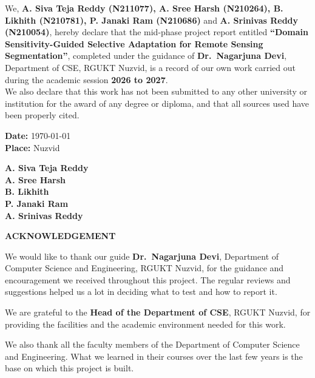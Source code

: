 \documentclass[11pt,a4paper]{report}
\newif\ifblankpage
\newcommand{\blankpage}{%
  \clearpage\blankpagetrue\thispagestyle{empty}\null\clearpage
  \blankpagefalse\addtocounter{page}{-1}}
\begin{document}
We, \textbf{A. Siva Teja Reddy (N211077), A. Sree Harsh (N210264), B. Likhith (N210781), P. Janaki Ram (N210686)} and \textbf{A. Srinivas Reddy (N210054)}, hereby declare that the mid-phase project report entitled \textbf{``Domain Sensitivity-Guided Selective Adaptation for Remote Sensing Segmentation''}, completed under the guidance of \textbf{Dr.~Nagarjuna Devi}, Department of CSE, RGUKT Nuzvid, is a record of our own work carried out during the academic session \textbf{2026 to 2027}.\\[0.4cm]

We also declare that this work has not been submitted to any other university or institution for the award of any degree or diploma, and that all sources used have been properly cited.

\vspace{0.8cm}
\noindent
\textbf{Date:} \today\\[0.3cm]
\textbf{Place:} Nuzvid

\vspace{0.6cm}
\begin{flushright}
\textbf{A. Siva Teja Reddy}\\
\textbf{A. Sree Harsh}\\
\textbf{B. Likhith}\\
\textbf{P. Janaki Ram}\\
\textbf{A. Srinivas Reddy}
\end{flushright}

\blankpage

\begin{center}
\textbf{\Large ACKNOWLEDGEMENT}
\end{center}

\vspace{0.5cm}
We would like to thank our guide \textbf{Dr.~Nagarjuna Devi}, Department of Computer Science and Engineering, RGUKT Nuzvid, for the guidance and encouragement we received throughout this project. The regular reviews and suggestions helped us a lot in deciding what to test and how to report it.

We are grateful to the \textbf{Head of the Department of CSE}, RGUKT Nuzvid, for providing the facilities and the academic environment needed for this work.

We also thank all the faculty members of the Department of Computer Science and Engineering. What we learned in their courses over the last few years is the base on which this project is built.
\end{document}
